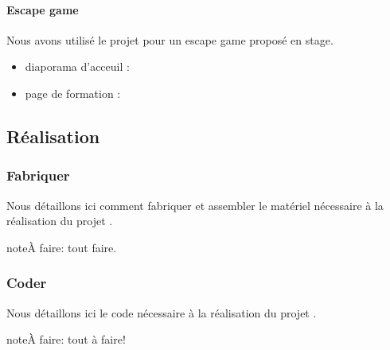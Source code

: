 \documentclass[letterpaper,10pt,french]{sphinxmanual}
\begin{document}
\paragraph{Escape game}
\label{\detokenize{projets/pierrot-exemple-escape:escape-game}}\label{\detokenize{projets/pierrot-exemple-escape::doc}}
Nous avons utilisé le projet {\hyperref[\detokenize{projets/pierrot:projetpierrot}]{}} pour un escape
game proposé en stage.
\begin{itemize}
\item {} 
diaporama d’acceuil : 

\item {} 
page de formation : 

\end{itemize}


\subsection{Réalisation}
\label{\detokenize{projets/pierrot:realisation}}

\subsubsection{Fabriquer}
\label{\detokenize{projets/pierrot-fabriquer::doc}}\label{\detokenize{projets/pierrot-fabriquer:fabriquer}}
Nous détaillons ici comment fabriquer et assembler
le matériel nécessaire à la réalisation du projet
{\hyperref[\detokenize{projets/pierrot:projetpierrot}]{}}.

\begin{sphinxadmonition}{note}{\label{projets/pierrot-fabriquer:index-0}À faire:}
tout faire.
\end{sphinxadmonition}


\subsubsection{Coder}
\label{\detokenize{projets/pierrot-coder:coder}}\label{\detokenize{projets/pierrot-coder::doc}}
Nous détaillons ici le code nécessaire à la réalisation
du projet {\hyperref[\detokenize{projets/pierrot:projetpierrot}]{}}.

\begin{sphinxadmonition}{note}{\label{projets/pierrot-coder:index-0}À faire:}
tout à faire!
\end{sphinxadmonition}
\end{document}
